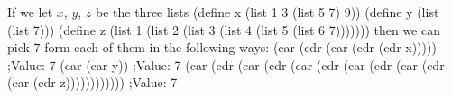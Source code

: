 If we let $x$, $y$, $z$ be the three lists
\begtt\scm
(define x (list 1 3 (list 5 7) 9))
(define y (list (list 7)))
(define z (list 1 (list 2 (list 3 (list 4 (list 5 (list 6 7)))))))
\endtt
then we can pick $7$ form each of them in the following ways:
\begtt\scm
(car (cdr (car (cdr (cdr x)))))
;Value: 7
(car (car y))
;Value: 7
(car (cdr (car (cdr (car (cdr (car (cdr (car (cdr (car (cdr z))))))))))))
;Value: 7
\endtt
